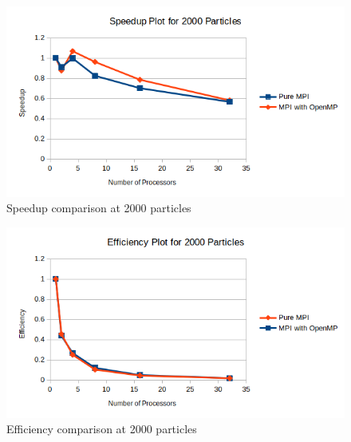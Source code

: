 \documentclass{article}
\begin{document}
\begin{figure}[H]
	\begin{center}
		\hspace*{-0.5cm}                                                           
  		\includegraphics[scale=0.7]{Report_Assets/speedup2000.png}
  	\end{center}
  	\caption{Speedup comparison at 2000 particles}
\end{figure}

\begin{figure}[H]
	\begin{center}
		\hspace*{-0.5cm}                                                           
  		\includegraphics[scale=0.7]{Report_Assets/efficiency2000.png}
  	\end{center}
  	\caption{Efficiency comparison at 2000 particles}
\end{figure}
\end{document}

